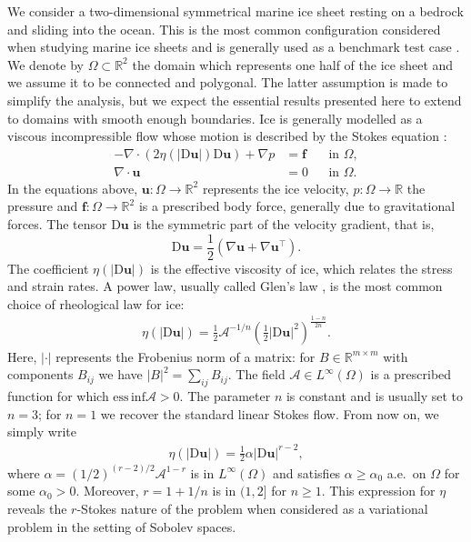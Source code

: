 \documentclass[onefignum,onetabnum]{siamart190516}
\newcommand{\RR}{\mathbb{R}}
\newcommand{\bu}{\boldsymbol{u}}
\newcommand{\bff}{\boldsymbol{f}}
\newcommand{\bD}{\boldsymbol{\mathrm{D}}}
\begin{document}
We consider a two-dimensional symmetrical marine ice sheet resting on a bedrock and sliding into the ocean. This is the most common configuration considered when studying marine ice sheets \cite{schoof2007a, schoof2007b, durand2009} and is generally used as a benchmark test case \cite{pattyn2012}. We denote by $\Omega\subset\RR^2$ the domain which represents one half of the ice sheet and we assume it to be connected and polygonal. The latter assumption is made to simplify the analysis, but we expect the essential results presented here to extend to domains with smooth enough boundaries. Ice is generally modelled as a viscous incompressible flow whose motion is described by the Stokes equation \cite{fowler2011}:
%
\begin{subequations}\label{eq:main}
	\begin{align}
		- \nabla \cdot \left( 2 \eta(|\bD\bu|) \bD\bu \right) + \nabla p &= \bff && \text{in $\Omega$}, \label{eq:main-subeq1}\\
		\nabla \cdot \bu &= 0 && \text{in $\Omega$}.\label{eq:main-subeq2}
	\end{align}
\end{subequations}	
%
In the equations above, $\bu: \Omega \to \mathbb{R}^2$ represents the ice velocity, $p: \Omega \to \mathbb{R}$ the pressure and $\bff: \Omega \to \mathbb{R}^2$ is a prescribed body force, generally due to gravitational forces. The tensor $\bD\bu$ is the symmetric part of the velocity gradient, that is,
%
\[
	\bD\bu = \frac{1}{2}\left( \nabla\bu + \nabla\bu^\top \right).
\]
%
The coefficient $\eta(|\bD\bu|)$ is the effective viscosity of ice, which relates the stress and strain rates. A power law, usually called Glen's law \cite{glen1958}, is the most common choice of rheological law for ice:
%
\begin{align}\label{eq:glens_law}
	\eta(|\bD\bu|) = \frac{1}{2} \mathcal{A}^{-1/n} \left( \frac{1}{2} |\bD\bu|^2 \right)^\frac{1-n}{2n}.
\end{align}
%
Here, $|\cdot|$ represents the Frobenius norm of a matrix: for $B\in\RR^{m\times m}$ with components $B_{ij}$ we have $|B|^2 = \sum_{ij}B_{ij}$. The field $\mathcal{A}\in L^\infty(\Omega)$ is a prescribed function for which $\mathrm{ess\, inf} \mathcal{A} > 0$. The parameter $n$ is constant and is usually set to $n=3$; for $n=1$ we recover the standard linear Stokes flow. From now on, we simply write 
%
\begin{align}\label{eq:rheology}
	\eta(|\bD\bu|) = \frac{1}{2}\alpha |\bD\bu|^{r-2},
\end{align}
%
where $\alpha = (1/2)^{(r-2)/2}\mathcal{A}^{1-r}$ is in $L^\infty(\Omega)$ and satisfies $\alpha \geq \alpha_0$ a.e.~on $\Omega$ for some $\alpha_0 > 0$. Moreover, $r = 1 + 1/n$ is in $(1,2]$ for $n \geq 1$. This expression for $\eta$ reveals the $r$-Stokes nature of the problem when considered as a variational problem in the setting of Sobolev spaces.
\end{document}
